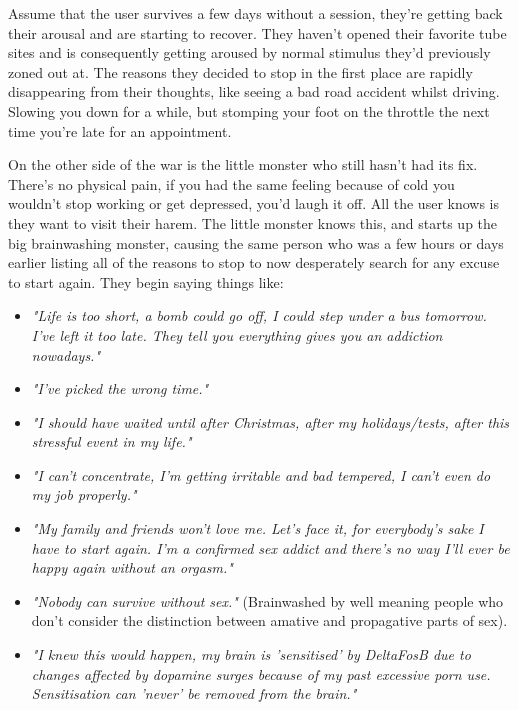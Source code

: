 \documentclass[easypeasy.tex]{subfiles}
\begin{document}
Assume that the user survives a few days without a session, they're getting back their arousal and are starting to recover. They haven't opened their favorite tube sites and is consequently getting aroused by normal stimulus they'd previously zoned out at. The reasons they decided to stop in the first place are rapidly disappearing from their thoughts, like seeing a bad road accident whilst driving. Slowing you down for a while, but stomping your foot on the throttle the next time you're late for an appointment.

On the other side of the war is the little monster who still hasn't had its fix. There's no physical pain, if you had the same feeling because of cold you wouldn't stop working or get depressed, you'd laugh it off. All the user knows is they want to visit their harem. The little monster knows this, and starts up the big brainwashing monster, causing the same person who was a few hours or days earlier listing all of the reasons to stop to now desperately search for any excuse to start again. They begin saying things like:
\begin{itemize}

  \item \textit{"Life is too short, a bomb could go off, I could step under a bus tomorrow. I've left it too late. They tell you everything gives you an addiction nowadays."}

  \item \textit{"I've picked the wrong time."}

  \item \textit{"I should have waited until after Christmas, after my holidays/tests, after this stressful event in my life."}

  \item \textit{"I can't concentrate, I'm getting irritable and bad tempered, I can't even do my job properly."}

  \item \textit{"My family and friends won't love me. Let's face it, for everybody's sake I have to start again. I'm a confirmed sex addict and there's no way I'll ever be happy again without an orgasm."}

  \item \textit{"Nobody can survive without sex."} (Brainwashed by well meaning people who don't consider the distinction between amative and propagative parts of sex).

  \item \textit{"I knew this would happen, my brain is 'sensitised' by DeltaFosB due to changes affected by dopamine surges because of my past excessive porn use. Sensitisation can 'never' be removed from the brain."}
\end{itemize}
\end{document}
